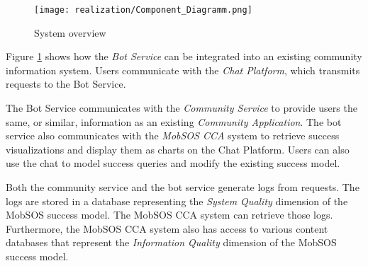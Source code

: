 \begin{figure}[h]
    \centering
    \texttt{[image: realization/Component\_Diagramm.png]}
    \caption{System overview}
    \label{fig:sytsemOverview}
\end{figure}

Figure \ref{fig:sytsemOverview} shows how the \emph{Bot Service} can be integrated into an existing community information system. Users communicate with the \emph{Chat Platform}, which transmits requests to the Bot Service.

The Bot Service communicates with the \emph{Community Service} to provide users the same, or similar, information as an existing \emph{Community Application}. The bot service also communicates with the \emph{MobSOS CCA} system to retrieve success visualizations and display them as charts on the Chat Platform. Users can also use the chat to model success queries and modify the existing success model.

Both the community service and the bot service generate logs from requests. The logs are stored in a database representing the \emph{System Quality} dimension of the MobSOS success model. The MobSOS CCA system can retrieve those logs. Furthermore, the MobSOS CCA system also has access to various content databases that represent the \emph{Information Quality} dimension of the MobSOS success model.